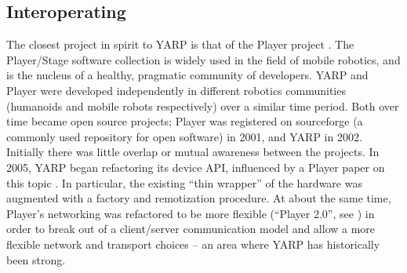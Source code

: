 








\subsection{Interoperating}

\label{sect:interop}

The closest project in spirit to YARP is that of the Player project
\cite{vaughan2006reusable}.  
%
%
The Player/Stage software collection is 
widely used in the field of mobile robotics, and is the nucleus of
a healthy, pragmatic community of developers.  
%
YARP and Player were developed
independently in different robotics communities (humanoids and mobile
robots respectively) over a similar time period.  Both over time
became open source projects; Player was registered on sourceforge (a
commonly used repository for open software) in 2001, and YARP in 2002.
Initially there was little overlap or mutual awareness between the
projects.  In 2005, YARP began refactoring its device API, influenced 
by a Player paper on this topic \cite{vaughan2003device}. In particular,
the existing ``thin wrapper'' of the hardware was augmented with
a factory and remotization procedure.
At about the same time, Player's networking was refactored to be
more flexible (``Player 2.0'', see \cite{collett2005player}) in 
order to break out of a client/server communication model and
allow a more flexible network and transport choices -- an area where 
YARP has historically been strong.  

